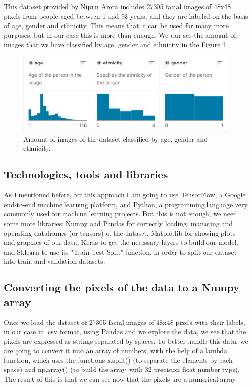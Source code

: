 \documentclass{article}
\begin{document}
This dataset provided by Nipun Arora includes 27305 facial images of 48x48 pixels from people aged between 1 and 93 years, and they are labeled on the basis of age, gender and ethnicity. This means that it can be used for many more purposes, but in our case this is more than enough. We can see the amount of images that we have classified by age, gender and ethnicity in the Figure \ref{fig:dataset}.

\begin{figure}[t]
\centering
\includegraphics[width=1\columnwidth]{dataset-properties.png}
\caption{Amount of images of the dataset classified by age, gender and ethnicity.\label{fig:dataset}}
\end{figure}

\subsection{Technologies, tools and libraries}

As I mentioned before, for this approach I am going to use TensorFlow\cite{tensorflow}, a Google end-to-end machine learning platform, and Python\cite{python}, a programming language very commonly used for machine learning projects. But this is not enough, we need some more libraries: Numpy and Pandas for correctly loading, managing and operating dataframes (or tensors) of the dataset, Matplotlib for showing plots and graphics of our data, Keras to get the necessary layers to build our model, and Sklearn to use its "Train Test Split" function, in order to split our dataset into train and validation datasets.

\subsection{Converting the pixels of the data to a Numpy array}

Once we load the dataset of 27305 facial images of 48x48 pixels with their labels, in our case in .csv format, using Pandas and we explore the data, we see that the pixels are expressed as strings separated by spaces. To better handle this data, we are going to convert it into an array of numbers, with the help of a lambda function, which uses the functions x.split() (to separate the elements by each space) and np.array() (to build the array, with 32 precision float number type). The result of this is that we can see now that the pixels are a numerical array.
\end{document}
